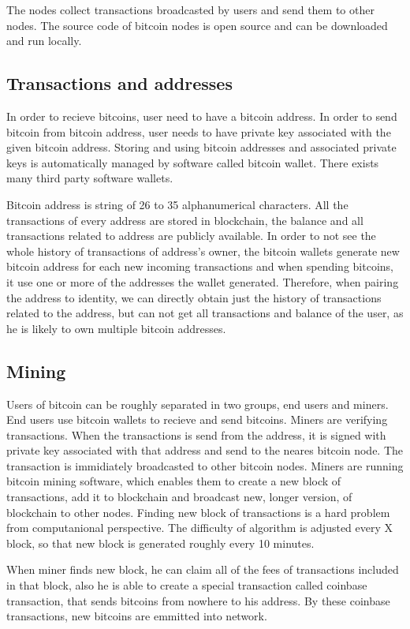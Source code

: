 \documentclass[
  digital, %
  table,   %
  lof,     %
  lot,     %
  oneside
]{fithesis3}
\begin{document}
The nodes collect transactions broadcasted by users and send them to other nodes.
The source code of bitcoin nodes is open source and can be downloaded and run locally. 

\subsection{Transactions and addresses}
In order to recieve bitcoins, user need to have a bitcoin address. In order to send bitcoin from bitcoin address,
 user needs to have private key associated with the given bitcoin address.
Storing and using bitcoin addresses and associated private keys is automatically managed
by software called bitcoin wallet. There exists many third party software wallets.

Bitcoin address is string of 26 to 35 alphanumerical characters.
All the transactions of every address are stored in blockchain, the balance and all transactions related to address are
publicly available.
In order to not see the whole history of transactions of address's owner,
the bitcoin wallets generate new bitcoin address for each new incoming transactions and when spending bitcoins, it use one or more of the addresses the wallet generated.
Therefore, when pairing the address to identity, we can directly obtain just the history of transactions related to the address,
but can not get all transactions and balance of the user, as he is likely to own multiple bitcoin addresses.

\subsection{Mining}
Users of bitcoin can be roughly separated in two groups, end users and miners.
End users use bitcoin wallets to recieve and send bitcoins.
Miners are verifying transactions. When the transactions is send from the address, 
it is signed with private key associated with that address and send to the neares bitcoin node.
The transaction is immidiately broadcasted to other bitcoin nodes.
Miners are running bitcoin mining software, which enables them to create a new block of transactions, add it to blockchain
and broadcast new, longer version, of blockchain to other nodes.
Finding new block of transactions is a hard problem from computanional perspective.
The difficulty of algorithm is adjusted every X block, so that new block is generated roughly every 10 minutes.

When miner finds new block, he can claim all of the fees of transactions included in that block,
also he is able to create a special transaction called coinbase transaction, that sends bitcoins from nowhere to his address.
By these coinbase transactions, new bitcoins are emmitted into network.
\end{document}
